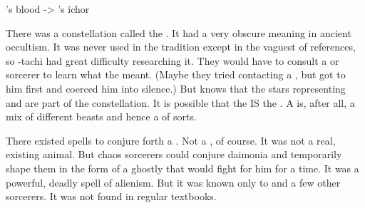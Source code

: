 \Chimaera's blood -> \Chimaera's ichor

There was a constellation called the \Malgryph.
It had a very obscure meaning in ancient \draconian occultism.
It was never used in the \rethyactic tradition except in the vaguest of references, so \Urizeth-tachi had great difficulty researching it. 
They would have to consult a \dragon or \quiljaar sorcerer to learn what the \Malgryph meant.
(Maybe they tried contacting a \quiljaar, but \Ishnaruchaefir got to him first and coerced him into silence.)
But \Urizeth knows that the stars representing \Zaz and \Urzaz are part of the \Malgryph constellation.
It is possible that the \Malgryph IS the \quo{\Chimaera}.
A \malgryph is, after all, a mix of different beasts and hence a \chimaera of sorts.

There existed spells to conjure forth a \malgryph.
Not a  \malgryph, of course. 
It was not a real, existing animal.
But chaos sorcerers could conjure daimonia and temporarily shape them in the form of a ghostly \malgryph that would fight for him for a time.
It was a powerful, deadly spell of alienism.
But it was known only to \dragons and a few other sorcerers.
It was not found in regular \rethyactic textbooks.

